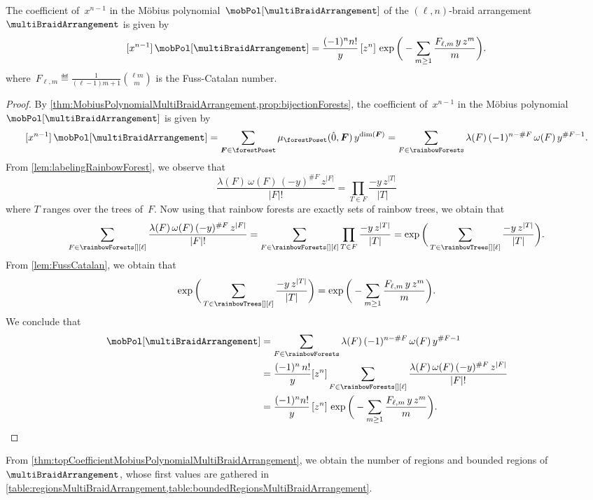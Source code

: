 \begin{theorem}
\label{thm:topCoefficientMobiusPolynomialMultiBraidArrangement}
The coefficient of~$x^{n-1}$ in the M\"obius polynomial~$\mobPol[{\multiBraidArrangement}]$ of the $(\ell,n)$-braid arrangement~$\multiBraidArrangement$ is given by
\[
[x^{n-1}] \, \mobPol[{\multiBraidArrangement}] = \frac{(-1)^n n!}{y} \, [z^n] \, \exp \bigg( - \sum_{m \ge 1} \frac{F_{\ell,m} \, y \, z^m}{m} \bigg).
\]
where~$\displaystyle F_{\ell,m} \eqdef \frac{1}{(\ell-1)m+1} \binom{\ell m}{m}$ is the Fuss-Catalan number.
\end{theorem}

\begin{proof}
By \cref{thm:MobiusPolynomialMultiBraidArrangement,prop:bijectionForests}, the coefficient of~$x^{n-1}$ in the M\"obius polynomial~$\mobPol[{\multiBraidArrangement}]$ is given by
\[
[x^{n-1}] \, \mobPol[{\multiBraidArrangement}] = \sum_{\b{F} \in \forestPoset} \mu_{\forestPoset}(\hat 0, \b{F}) \, y^{\dim(\b{F})} = \sum_{F \in \rainbowForests} \lambda(F) \, (-1)^{n-\#F} \, \omega(F) \, y^{\#F-1}.
\]
From \cref{lem:labelingRainbowForest}, we observe that
\[
\frac{\lambda(F) \, \omega(F) \, (-y)^{\#F} \, z^{|F|}}{|F|!} = \prod_{T \in F} \frac{-y \, z^{|T|}}{|T|}
\]
where $T$ ranges over the trees of~$F$.
Now using that rainbow forests are exactly sets of rainbow trees, we obtain that
\[
\sum_{F \in \rainbowForests[][\ell]} \frac{ \lambda(F) \, \omega(F) \, (-y)^{\#F} \, z^{|F|}}{|F|!} = \sum_{F \in \rainbowForests[][\ell]} \prod_{T \in F} \frac{-y \, z^{|T|}}{|T|} = \exp \bigg( \sum_{T \in \rainbowTrees[][\ell]} \frac{-y \, z^{|T|}}{|T|} \bigg).
\]
From \cref{lem:FussCatalan}, we obtain that
\[
\exp \bigg( \sum_{T \in \rainbowTrees[][\ell]} \frac{-y \, z^{|T|}}{|T|} \bigg) = \exp \bigg( - \sum_{m \ge 1} \frac{F_{\ell,m} \, y \, z^m}{m} \bigg).
\]
We conclude that
\begin{align*}
[x^{n-1}] \, \mobPol[{\multiBraidArrangement}] 
& = \sum_{F \in \rainbowForests}  \lambda(F) \, (-1)^{n-\#F} \, \omega(F) \, y^{\#F-1} \\
& = \frac{(-1)^n \, n!}{y} [z^n] \sum_{F \in \rainbowForests[][\ell]} \frac{ \lambda(F) \, \omega(F) \, (-y)^{\#F} \, z^{|F|}}{|F|!} \\
& = \frac{(-1)^n n!}{y} \, [z^n] \, \exp \bigg( - \sum_{m \ge 1} \frac{F_{\ell,m} \, y \, z^m}{m} \bigg).
\qedhere
\end{align*}
\end{proof}

From \cref{thm:topCoefficientMobiusPolynomialMultiBraidArrangement}, we obtain the number of regions and bounded regions of~$\multiBraidArrangement$, whose first values are gathered in \cref{table:regionsMultiBraidArrangement,table:boundedRegionsMultiBraidArrangement}.

